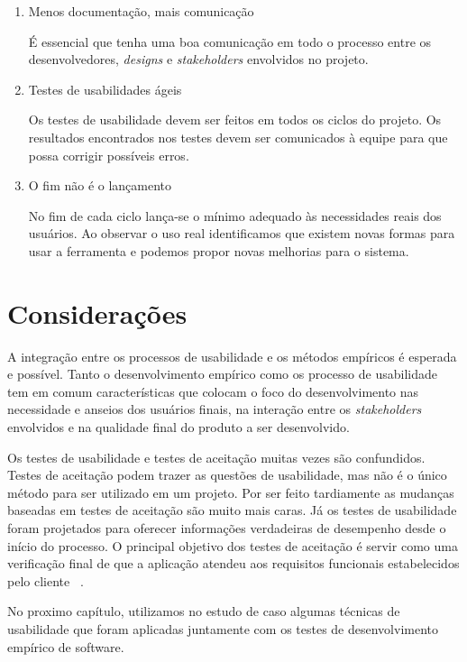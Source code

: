 \begin{enumerate}
	
\item Menos documentação, mais comunicação

	É essencial que tenha uma boa comunicação em todo o processo entre os desenvolvedores, \emph{designs} e \textit{stakeholders} envolvidos no projeto.



\item Testes de usabilidades ágeis

	Os testes de usabilidade devem ser feitos em todos os ciclos do projeto.  Os resultados encontrados nos testes devem ser comunicados à equipe para que possa corrigir possíveis erros.

\item O fim não é o lançamento

	No fim de cada ciclo lança-se o mínimo adequado às necessidades reais dos usuários. Ao observar o uso real identificamos que existem novas formas para usar a ferramenta e podemos propor novas melhorias para o sistema. 
	
\end{enumerate}


\section{Considerações}

	A integração entre os processos de usabilidade e os métodos empíricos é esperada e possível. Tanto o desenvolvimento empírico como os processo de usabilidade tem em comum características que colocam o foco do desenvolvimento nas necessidade e anseios dos usuários finais, na interação entre os \textit{stakeholders} envolvidos e na qualidade final do produto a ser desenvolvido. 
	
	Os testes de usabilidade e testes de aceitação muitas vezes são confundidos. Testes de aceitação podem trazer as questões de usabilidade, mas não é o único método para ser utilizado em um projeto. Por ser feito tardiamente as mudanças baseadas em testes de aceitação são muito mais caras. Já os testes de usabilidade foram projetados para oferecer informações verdadeiras de desempenho desde o início do processo.  
%
O principal objetivo dos testes de aceitação é servir como uma verificação final de que a aplicação atendeu aos requisitos funcionais estabelecidos pelo cliente ~\cite{preece2007}.

No proximo capítulo, utilizamos no estudo de caso algumas técnicas de usabilidade que foram aplicadas juntamente com os testes de desenvolvimento empírico de software.






